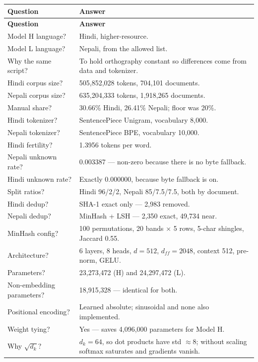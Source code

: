 \documentclass[11pt]{report}
\begin{document}
\begin{longtable}{@{}p{6.6cm}p{8.4cm}@{}}
\toprule
\textbf{Question} & \textbf{Answer} \\
\midrule
\endfirsthead
\toprule
\textbf{Question} & \textbf{Answer} \\
\midrule
\endhead
Model H language? & Hindi, higher-resource. \\
Model L language? & Nepali, from the allowed list. \\
Why the same script? & To hold orthography constant so differences come from data and tokenizer. \\
Hindi corpus size? & 505,852,028 tokens, 704,101 documents. \\
Nepali corpus size? & 635,204,333 tokens, 1,918,265 documents. \\
Manual share? & 30.66\% Hindi, 26.41\% Nepali; floor was 20\%. \\
Hindi tokenizer? & SentencePiece Unigram, vocabulary 8,000. \\
Nepali tokenizer? & SentencePiece BPE, vocabulary 10,000. \\
Hindi fertility? & 1.3956 tokens per word. \\
Nepali unknown rate? & 0.003387 --- non-zero because there is no byte fallback. \\
Hindi unknown rate? & Exactly 0.000000, because byte fallback is on. \\
Split ratios? & Hindi 96/2/2, Nepali 85/7.5/7.5, both by document. \\
Hindi dedup? & SHA-1 exact only --- 2,983 removed. \\
Nepali dedup? & MinHash + LSH --- 2,350 exact, 49,734 near. \\
MinHash config? & 100 permutations, 20 bands $\times$ 5 rows, 5-char shingles, Jaccard 0.55. \\
Architecture? & 6 layers, 8 heads, $d=512$, $d_{ff}=2048$, context 512, pre-norm, GELU. \\
Parameters? & 23,273,472 (H) and 24,297,472 (L). \\
Non-embedding parameters? & 18,915,328 --- identical for both. \\
Positional encoding? & Learned absolute; sinusoidal and none also implemented. \\
Weight tying? & Yes --- saves 4,096,000 parameters for Model H. \\
Why $\sqrt{d_k}$? & $d_k=64$, so dot products have std ${\approx}8$; without scaling softmax saturates and gradients vanish. \\

\end{longtable}
\end{document}

